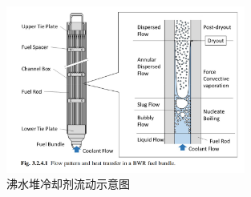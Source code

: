 \documentclass{article}
\begin{document}
\begin{figure}[htbp]
    \centering
    \includegraphics[width=0.7\textwidth]{figures/BWR-water.png}
    \caption{沸水堆冷却剂流动示意图}
    \label{fig:BWR-water}
\end{figure}


\end{document}
